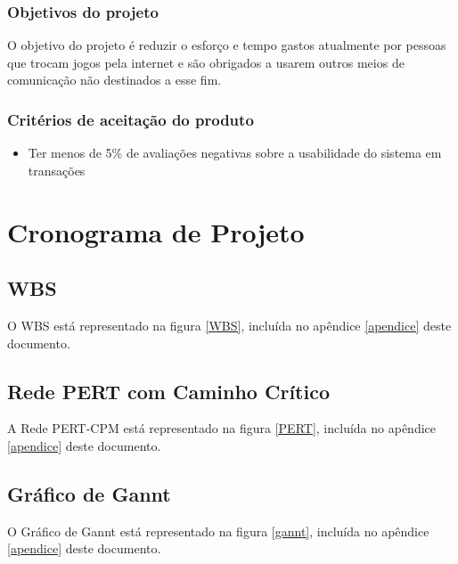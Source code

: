 \documentclass[a4paper,11pt]{article}
\begin{document}
		\subsubsection{Objetivos do projeto}
			O objetivo do projeto é reduzir o esforço e tempo gastos atualmente por pessoas que trocam jogos pela internet e são obrigados a usarem outros meios de comunicação não destinados a esse fim.
			
		\subsubsection{Critérios de aceitação do produto}
			\begin{itemize}
				\item Ter menos de 5\% de avaliações negativas sobre a usabilidade do sistema em transações
			\end{itemize}
	
\section{Cronograma de Projeto}
	\subsection{WBS}
    	O WBS está representado na figura \ref{WBS}, incluída no apêndice \ref{apendice} deste documento.
	\subsection{Rede PERT com Caminho Crítico}
		A Rede PERT-CPM está representado na figura \ref{PERT}, incluída no apêndice \ref{apendice} deste documento.
	\subsection{Gráfico de Gannt}
		O Gráfico de Gannt está representado na figura \ref{gannt}, incluída no apêndice \ref{apendice} deste documento.
\end{document}
